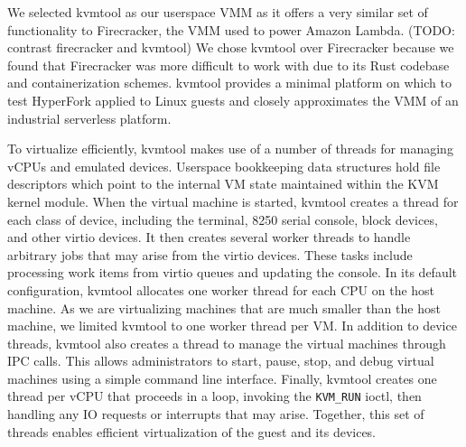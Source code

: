 We selected kvmtool as our userspace VMM as it offers a very similar set of
functionality to Firecracker, the VMM used to power Amazon Lambda. (TODO:
contrast firecracker and kvmtool) We chose kvmtool over Firecracker because we
found that Firecracker was more difficult to work with due to its Rust codebase
and containerization schemes. kvmtool provides a minimal platform on which to
test HyperFork applied to Linux guests and closely approximates the VMM of an
industrial serverless platform.

To virtualize efficiently, kvmtool makes use of a number of threads for
managing vCPUs and emulated devices. Userspace bookkeeping data structures hold
file descriptors which point to the internal VM state maintained within the KVM
kernel module. When the virtual machine is started, kvmtool creates a thread
for each class of device, including the terminal, 8250 serial console, block
devices, and other virtio devices. It then creates several worker threads to
handle arbitrary jobs that may arise from the virtio devices. These tasks
include processing work items from virtio queues and updating the console. In
its default configuration, kvmtool allocates one worker thread for each CPU on
the host machine. As we are virtualizing machines that are much smaller than
the host machine, we limited kvmtool to one worker thread per VM. In addition
to device threads, kvmtool also creates a thread to manage the virtual machines
through IPC calls. This allows administrators to start, pause, stop, and debug
virtual machines using a simple command line interface. Finally, kvmtool
creates one thread per vCPU that proceeds in a loop, invoking the
\texttt{KVM\_RUN} ioctl, then handling any IO requests or interrupts that may
arise. Together, this set of threads enables efficient virtualization of the
guest and its devices.
